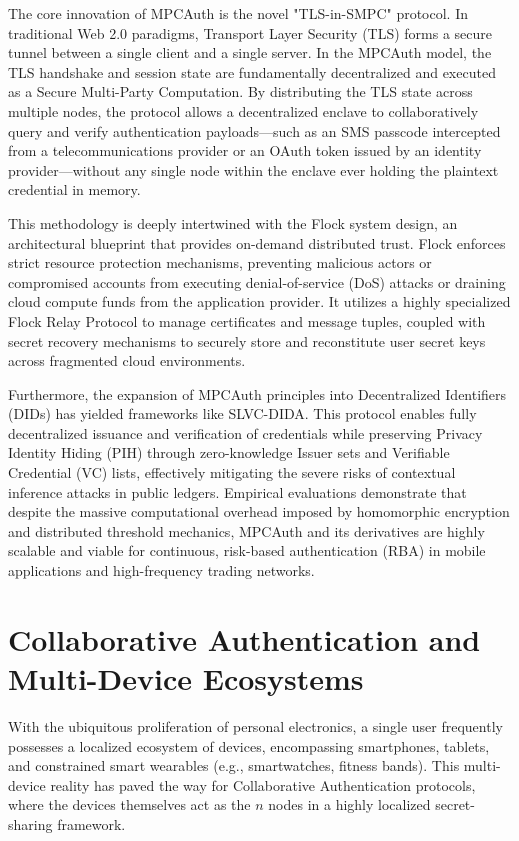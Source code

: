 \documentclass[11pt, a4paper]{article}
\begin{document}
The core innovation of MPCAuth is the novel "TLS-in-SMPC" protocol. In traditional Web 2.0 paradigms, Transport Layer Security (TLS) forms a secure tunnel between a single client and a single server. In the MPCAuth model, the TLS handshake and session state are fundamentally decentralized and executed as a Secure Multi-Party Computation. By distributing the TLS state across multiple nodes, the protocol allows a decentralized enclave to collaboratively query and verify authentication payloads—such as an SMS passcode intercepted from a telecommunications provider or an OAuth token issued by an identity provider—without any single node within the enclave ever holding the plaintext credential in memory.

This methodology is deeply intertwined with the Flock system design, an architectural blueprint that provides on-demand distributed trust. Flock enforces strict resource protection mechanisms, preventing malicious actors or compromised accounts from executing denial-of-service (DoS) attacks or draining cloud compute funds from the application provider. It utilizes a highly specialized Flock Relay Protocol to manage certificates and message tuples, coupled with secret recovery mechanisms to securely store and reconstitute user secret keys across fragmented cloud environments.

Furthermore, the expansion of MPCAuth principles into Decentralized Identifiers (DIDs) has yielded frameworks like SLVC-DIDA. This protocol enables fully decentralized issuance and verification of credentials while preserving Privacy Identity Hiding (PIH) through zero-knowledge Issuer sets and Verifiable Credential (VC) lists, effectively mitigating the severe risks of contextual inference attacks in public ledgers. Empirical evaluations demonstrate that despite the massive computational overhead imposed by homomorphic encryption and distributed threshold mechanics, MPCAuth and its derivatives are highly scalable and viable for continuous, risk-based authentication (RBA) in mobile applications and high-frequency trading networks.

\section*{Collaborative Authentication and Multi-Device Ecosystems}
With the ubiquitous proliferation of personal electronics, a single user frequently possesses a localized ecosystem of devices, encompassing smartphones, tablets, and constrained smart wearables (e.g., smartwatches, fitness bands). This multi-device reality has paved the way for Collaborative Authentication protocols, where the devices themselves act as the $n$ nodes in a highly localized secret-sharing framework.
\end{document}
